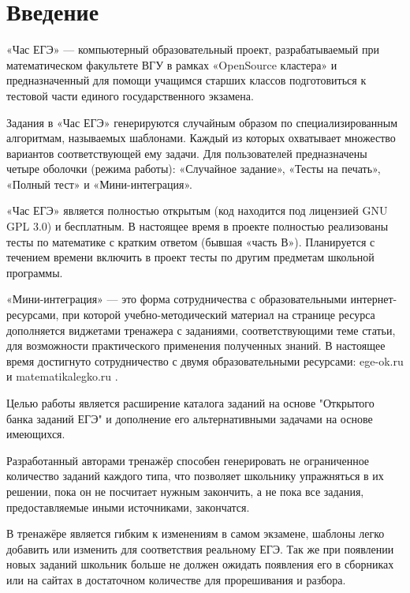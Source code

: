 \documentclass[a4paper,12pt]{article}
\begin{document}
	\section{Введение}%
	«Час ЕГЭ» — компьютерный образовательный проект, разрабатываемый при математическом факультете ВГУ в рамках «OpenSource кластера» и предназначенный для помощи учащимся старших классов подготовиться к тестовой части единого государственного экзамена. 
	
	Задания в «Час ЕГЭ» генерируются случайным образом по специализированным алгоритмам, называемых шаблонами. Каждый из которых охватывает множество вариантов соответствующей ему задачи. Для пользователей предназначены четыре оболочки (режима работы): «Случайное задание», «Тесты на печать», «Полный тест» и «Мини-интеграция».
	
	«Час ЕГЭ» является полностью открытым (код находится под лицензией GNU GPL 3.0) и бесплатным. В настоящее время в проекте полностью реализованы тесты по математике с кратким ответом (бывшая «часть В»). Планируется с течением времени включить в проект тесты по другим предметам школьной программы.
	
	«Мини-интеграция» — это форма сотрудничества с образовательными интернет-ресурсами, при которой учебно-методический материал на странице ресурса дополняется виджетами тренажера с заданиями, соответствующими теме статьи, для возможности практического применения полученных знаний. В настоящее время достигнуто сотрудничество с двумя образовательными ресурсами: ege-ok.ru и matematikalegko.ru .
	
	Целью работы является расширение каталога заданий на основе "Открытого банка заданий ЕГЭ" и дополнение его альтернативными задачами	на основе имеющихся. 
	
	Разработанный авторами тренажёр способен генерировать не ограниченное количество заданий каждого типа, что позволяет школьнику упражняться в их решении, пока он не посчитает нужным закончить, а не пока все задания, предоставляемые иными источниками, закончатся. 
	
	В тренажёре является гибким к изменениям в самом экзамене, шаблоны легко добавить или изменить для соответствия реальному ЕГЭ. Так же при появлении новых заданий школьник больше не должен ожидать появления его в сборниках или на сайтах в достаточном количестве для прорешивания и разбора.
	
\end{document}
